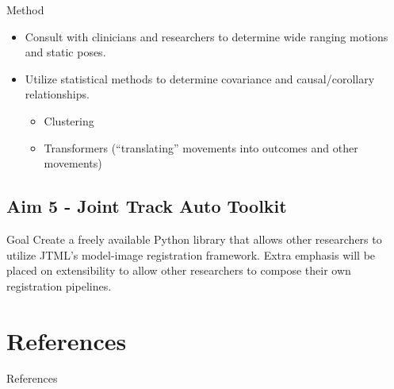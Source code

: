 \documentclass[presentation, aspectratio=1610]{beamer}
\begin{document}
\begin{frame}[label={sec:org14165e9}]{Method}
\begin{itemize}
\item Consult with clinicians and researchers to determine wide ranging motions and static poses.
\item Utilize statistical methods to determine covariance and causal/corollary relationships.
\begin{itemize}
\item Clustering
\item Transformers \autocites{carionEndtoEndObjectDetection2020}[][]{vaswaniAttentionAllYou2017}[][]{guoAttentionMechanismsComputer2021}[][]{dosovitskiyImageWorth16x162021} (``translating'' movements into outcomes and other movements)
\end{itemize}
\end{itemize}
\end{frame}
\subsection{Aim 5 - Joint Track Auto Toolkit}
\label{sec:org6f3367b}
\begin{frame}[label={sec:orgf282929}]{Goal}
Create a freely available Python library that allows other researchers to utilize JTML's model-image registration framework. Extra emphasis will be placed on extensibility to allow other researchers to compose their own registration pipelines.
\end{frame}
\section{References}
\label{sec:org717e92c}
\begin{frame}[label={sec:org6740542},fragile, allowframebreaks, label=]{References}
\AtNextBibliography{\tiny}
\printbibliography
\end{frame}
\end{document}
